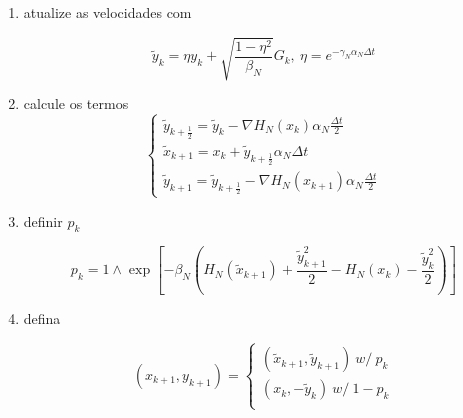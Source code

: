 \begin{enumerate}
	\item atualize as velocidades com
	
	\[
		\tilde{y}_k = \eta y_k + \sqrt{\frac{1-\eta^2}{\beta_N}} G_k, \ \eta = e^{-\gamma_N \alpha_N \Delta t}
	\]
	
	\item calcule os termos
	\[
		\begin{cases}
			\tilde{y}_{k+\frac{1}{2}} = \tilde{y}_k - \nabla H_N(x_k) \alpha_N \frac{\Delta t}{2} \\
			\tilde{x}_{k+1} = x_k + \tilde{y}_{k + \frac{1}{2}} \alpha_N \Delta t \\
			\tilde{y}_{k+1} = \tilde{y}_{k+\frac{1}{2}} - \nabla H_N(x_{k+1}) \alpha_N \frac{\Delta t}{2}
		\end{cases}
	\]
	
	\item definir $p_k$
	
	\[
		p_k = 1 \wedge \exp{\left[ -\beta_N \left(  H_N(\tilde{x}_{k+1}) + \frac{\tilde{y}^2_{k+1}}{2} - H_N(x_k) - \frac{\tilde{y}^2_k}{2} \right)\right] }
	\]
	
	\item defina
	
	\[
		(x_{k+1}, y_{k+1}) = 
		\begin{cases}
			(\tilde{x}_{k+1}, \tilde{y}_{k+1}) \ w/ \ p_k \\
			(x_k, -\tilde{y}_{k}) \ w/ \ 1-p_k \\
		\end{cases}
	\]
	
\end{enumerate}







